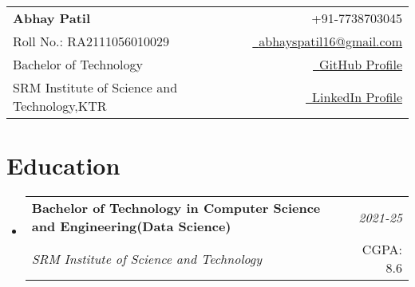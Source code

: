 \documentclass[a4paper,11pt]{article}
\makeatletter
\newcommand{\resumeSubheading}[4]{
\vspace{0.5mm}\item
    \begin{tabular*}{0.98\textwidth}[t]{l@{\extracolsep{\fill}}r}
        \textbf{#1} & \textit{\footnotesize{#4}} \\
        \textit{\footnotesize{#3}} &  \footnotesize{#2}\\
    \end{tabular*}
    \vspace{-2.4mm}
}
\newcommand{\resumeSubHeadingListStart}{\begin{itemize}[leftmargin=*,labelsep=0mm]}
\newcommand{\resumeSubHeadingListEnd}{\end{itemize}\vspace{2mm}}
\newcommand{\name}{\textbf{Abhay Patil}} %
\newcommand{\roll}{RA2111056010029} %
\newcommand{\phone}{7738703045} %
\newcommand{\emaila}{abhayspatil16@gmail.com} %
\makeatother
\begin{document}
\selectfont

{
\begin{tabularx}{\linewidth}{L r} \\
  \textbf{\Large \name} & {\raisebox{0.0\height}{\footnotesize \faPhone}\ +91-\phone}\\
  {Roll No.: \roll } & \href{mailto:\emaila}{\raisebox{0.0\height}{\footnotesize \faEnvelope}\ {\emaila}} \\
  Bachelor of Technology & \href{https://github.com/patilabhay0616}{\raisebox{0.0\height}{\footnotesize \faGithub}\ {GitHub Profile}} \\  
  {SRM Institute of Science and Technology,KTR} & \href{https://www.linkedin.com/in/abhay-patil-2b2a29229/}{\raisebox{0.0\height}{\footnotesize \faLinkedin}\ {LinkedIn Profile}}
\end{tabularx}
}


\section{\textbf{Education}}
  \resumeSubHeadingListStart
    \resumeSubheading
      {Bachelor of Technology in Computer Science and Engineering(Data Science)}{CGPA: 8.6}
      {SRM Institute of Science and Technology}{2021-25}
  \resumeSubHeadingListEnd
\vspace{-5.5mm}
\vspace{1mm}
\end{document}
